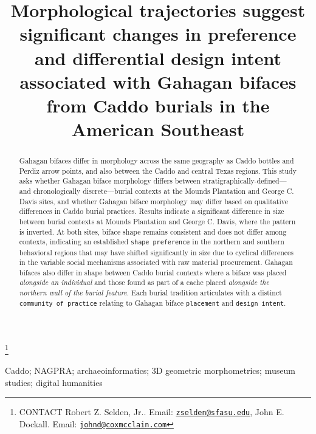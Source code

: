 \documentclass[]{interact}
\theoremstyle{plain}%
\theoremstyle{definition}
\theoremstyle{remark}
\begin{document}

\title{Morphological trajectories suggest significant changes in
preference and differential design intent associated with Gahagan
bifaces from Caddo burials in the American Southeast}


\author{
}

\thanks{CONTACT Robert Z. Selden,
Jr.. Email: \href{mailto:zselden@sfasu.edu}{\nolinkurl{zselden@sfasu.edu}}, John
E.
Dockall. Email: \href{mailto:johnd@coxmcclain.com}{\nolinkurl{johnd@coxmcclain.com}}}

\maketitle

\begin{abstract}
Gahagan bifaces differ in morphology across the same geography as Caddo
bottles and Perdiz arrow points, and also between the Caddo and central
Texas regions. This study asks whether Gahagan biface morphology differs
between stratigraphically-defined---and chronologically
discrete---burial contexts at the Mounds Plantation and George C. Davis
sites, and whether Gahagan biface morphology may differ based on
qualitative differences in Caddo burial practices. Results indicate a
significant difference in size between burial contexts at Mounds
Plantation and George C. Davis, where the pattern is inverted. At both
sites, biface shape remains consistent and does not differ among
contexts, indicating an established \texttt{shape\ preference} in the
northern and southern behavioral regions that may have shifted
significantly in size due to cyclical differences in the variable social
mechanisms associated with raw material procurement. Gahagan bifaces
also differ in shape between Caddo burial contexts where a biface was
placed \emph{alongside an individual} and those found as part of a cache
placed \emph{alongside the northern wall of the burial feature}. Each
burial tradition articulates with a distinct
\texttt{community\ of\ practice} relating to Gahagan biface
\texttt{placement} and \texttt{design\ intent}.
\end{abstract}

\begin{keywords}
Caddo; NAGPRA; archaeoinformatics; 3D geometric morphometrics; museum
studies; digital humanities
\end{keywords}
\end{document}
